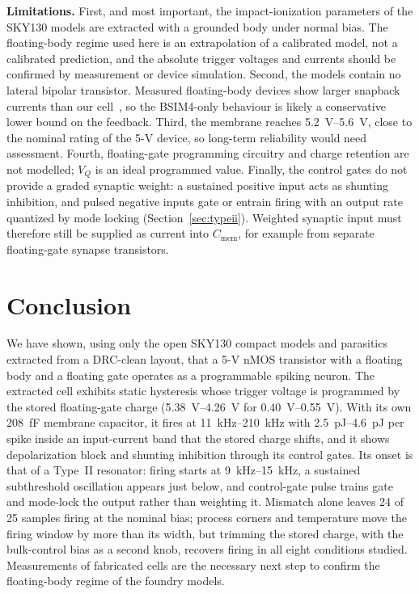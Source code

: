 \documentclass[a4paper,fleqn]{cas-dc}
\begin{document}
\textbf{Limitations.} First, and most important, the impact-ionization parameters of the SKY130 models are extracted with a grounded body under normal bias. The floating-body regime used here is an extrapolation of a calibrated model, not a calibrated prediction, and the absolute trigger voltages and currents should be confirmed by measurement or device simulation. Second, the models contain no lateral bipolar transistor. Measured floating-body devices show larger snapback currents than our cell~\cite{pazos2025}, so the BSIM4-only behaviour is likely a conservative lower bound on the feedback. Third, the membrane reaches \SIrange{5.2}{5.6}{V}, close to the nominal rating of the 5-V device, so long-term reliability would need assessment. Fourth, floating-gate programming circuitry and charge retention are not modelled; $V_Q$ is an ideal programmed value. Finally, the control gates do not provide a graded synaptic weight: a sustained positive input acts as shunting inhibition, and pulsed negative inputs gate or entrain firing with an output rate quantized by mode locking (Section~\ref{sec:typeii}). Weighted synaptic input must therefore still be supplied as current into $C_{\mathrm{mem}}$, for example from separate floating-gate synapse transistors.

\section{Conclusion}
\label{sec:conclusion}

We have shown, using only the open SKY130 compact models and parasitics extracted from a DRC-clean layout, that a 5-V nMOS transistor with a floating body and a floating gate operates as a programmable spiking neuron. The extracted cell exhibits static hysteresis whose trigger voltage is programmed by the stored floating-gate charge (\SIrange{5.38}{4.26}{V} for \SIrange{0.40}{0.55}{V}). With its own \SI{208}{fF} membrane capacitor, it fires at \SIrange{11}{210}{kHz} with \SIrange{2.5}{4.6}{pJ} per spike inside an input-current band that the stored charge shifts, and it shows depolarization block and shunting inhibition through its control gates. Its onset is that of a Type~II resonator: firing starts at \SIrange{9}{15}{kHz}, a sustained subthreshold oscillation appears just below, and control-gate pulse trains gate and mode-lock the output rather than weighting it. Mismatch alone leaves 24 of 25 samples firing at the nominal bias; process corners and temperature move the firing window by more than its width, but trimming the stored charge, with the bulk-control bias as a second knob, recovers firing in all eight conditions studied. Measurements of fabricated cells are the necessary next step to confirm the floating-body regime of the foundry models.
\end{document}
